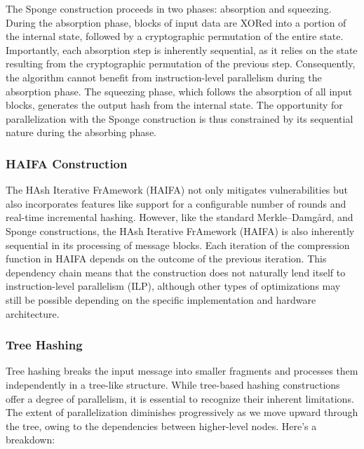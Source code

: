 \documentclass[10pt]{article}
\begin{document}
The Sponge construction proceeds in two phases: absorption and squeezing.
During the absorption phase, blocks of input data are XORed into a portion of the internal state, followed by a cryptographic permutation of the entire state. Importantly, each absorption step is inherently sequential, as it relies on the state resulting from the cryptographic permutation of the previous step. Consequently, the algorithm cannot benefit from instruction-level parallelism during the absorption phase.
The squeezing phase, which follows the absorption of all input blocks, generates the output hash from the internal state.
The opportunity for parallelization with the Sponge construction is thus constrained by its sequential nature during the absorbing phase.

\subsubsection{HAIFA Construction}

The HAsh Iterative FrAmework (HAIFA) not only mitigates vulnerabilities but also incorporates features like support for a configurable number of rounds and real-time incremental hashing.
However, like the standard Merkle–Damgård, and Sponge constructions, the HAsh Iterative FrAmework (HAIFA) is also inherently sequential in its processing of message blocks.
Each iteration of the compression function in HAIFA depends on the outcome of the previous iteration.
This dependency chain means that the construction does not naturally lend itself to instruction-level parallelism (ILP), although other types of optimizations may still be possible depending on the specific implementation and hardware architecture.

\subsubsection{Tree Hashing}

Tree hashing breaks the input message into smaller fragments and processes them independently in a tree-like structure.
While tree-based hashing constructions offer a degree of parallelism, it is essential to recognize their inherent limitations. The extent of parallelization diminishes progressively as we move upward through the tree, owing to the dependencies between higher-level nodes. Here's a breakdown:
\end{document}
